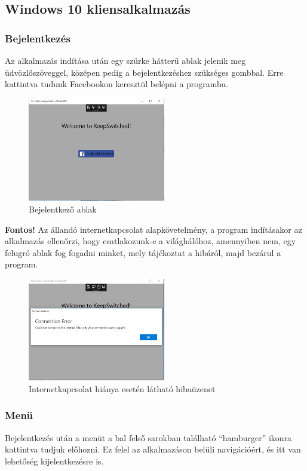 \documentclass[a4paper,12pt]{report}
\begin{document}
    \subsection{Windows 10 kliensalkalmazás}

    \subsubsection{Bejelentkezés}
    Az alkalmazás indítása után egy szürke hátterű ablak jelenik meg üdvözlőszöveggel, középen pedig a bejelentkezéshez szükséges
    gombbal. Erre kattintva tudunk Facebookon keresztül belépni a programba.

    \begin{figure}[H]
        \centering
        \includegraphics[width=6cm]{images/loginview.jpg}
        \caption{Bejelentkező ablak}
        \label{fig: Login}
    \end{figure}

    \textbf{Fontos!} Az állandó internetkapcsolat alapkövetelmény, a program indításakor az alkalmazás ellenőrzi, hogy csatlakozunk-e
    a világhálóhoz, amennyiben nem, egy felugró ablak fog fogadni minket, mely tájékoztat a hibáról, majd bezárul a program.

    \begin{figure}[H]
        \centering
        \includegraphics[width=6cm]{images/connectionerror.jpg}
        \caption{Internetkapcsolat hiánya esetén látható hibaüzenet}
        \label{fig: ConnectionError}
    \end{figure}

    \subsubsection{Menü}
    Bejelentkezés után a menüt a bal felső sarokban található ``hamburger'' ikonra kattintva tudjuk előhozni. Ez felel az
    alkalmazáson belüli navigációért, és itt van lehetőség kijelentkezésre is.
\end{document}
